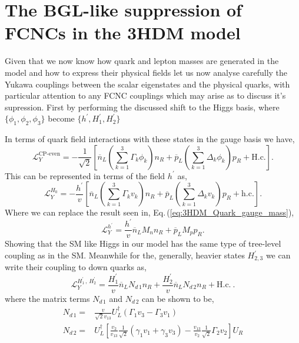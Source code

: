 \section{The BGL-like suppression of FCNCs in the 3HDM model}

Given that we now know how quark and lepton masses are generated in the model and how to express their physical fields let us now analyse carefully the Yukawa couplings between the scalar eigenstates and the physical quarks, with particular attention to any FCNC couplings which may arise as to discuss it's supression.
%
First by performing the discussed shift to the Higgs basis, where $\{\phi_1 , \phi_2 , \phi_3\}$ become $\{h^\prime , H_1^\prime , H_2^\prime \}$ 

In terms of quark field interactions with these states in the gauge basis we have, 
%
\begin{equation}
\mathcal{L}_Y^{\text{CP-even}} = 
- \frac{1}{\sqrt{2}} \left[ \overline{n}_L \left( \sum_{k=1}^3 \Gamma_k \phi_k \right) n_R + \overline{p}_L \left( \sum_{k=1}^3 \Delta_k \phi_k \right) p_R  + \text{H.c.}  \right] . 
\end{equation}
This can be represented in terms of the field $h^\prime$ as, 
\begin{equation}
\mathcal{L}_Y^{H_0} =
- \frac{h^\prime}{v} \left[ \overline{n}_L \left( \sum_{k=1}^3 \Gamma_k v_k \right) n_R + \overline{p}_L \left( \sum_{k=1}^3 \Delta_k v_k \right) p_R + \text{h.c.} \right] .
\end{equation}
%
Where we can replace the result seen in, Eq.\,(\ref{eq:3HDM_Quark_gauge_mass}), 
%
\begin{equation}
\mathcal{L}_Y^{h^\prime} = \frac{h^\prime}{v} \overline{n}_L M_n n_R +  \overline{p}_L M_p p_R .  
\end{equation} 
Showing that the SM like Higgs in our model has the same type of tree-level coupling as in the SM. 
%
Meanwhile for the, generally, heavier states $H_{2,3}^\prime$ we can write their coupling to down quarks as, 
\begin{equation}
\mathcal{L}^{H_1^\prime \, , \, H_2^\prime}_Y = 
\frac{H_1^\prime}{v} \overline{n}_L N_{d\,1} n_R + 
\frac{H_2^\prime}{v} \overline{n}_L N_{d\,2} n_R + 
\text{H.c.} \ . 
\end{equation} 
% 
where the matrix terms $N_{d\,1}$ and $N_{d\,2}$ can be shown to be, 
\begin{equation}
\begin{split}
N_{d\,1} = & \frac{v}{\sqrt{2} v_{13}} U_L^\dagger \left( \Gamma_1 v_3 - \Gamma_3 v_1 \right) \\ 
N_{d\,2} = & U_L^\dagger \left[ \frac{v_2}{v_{13}} \frac{1}{\sqrt{2}} \left( \gamma_1 v_1 + \gamma_3 v_3 \right) - \frac{v_{13}}{v_2} \frac{1}{\sqrt{2}} \Gamma_2 v_2  \right] U_R 
\end{split} 
\end{equation}

